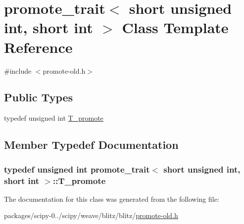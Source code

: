 \hypertarget{classpromote__trait_3_01short_01unsigned_01int_00_01short_01int_01_4}{}\section{promote\+\_\+trait$<$ short unsigned int, short int $>$ Class Template Reference}
\label{classpromote__trait_3_01short_01unsigned_01int_00_01short_01int_01_4}


{\ttfamily \#include $<$promote-\/old.\+h$>$}

\subsection*{Public Types}
\begin{DoxyCompactItemize}
\item 
typedef unsigned int \hyperlink{classpromote__trait_3_01short_01unsigned_01int_00_01short_01int_01_4_ad3579ce5a287118160697a2a5db0a756}{T\+\_\+promote}
\end{DoxyCompactItemize}


\subsection{Member Typedef Documentation}
\hypertarget{classpromote__trait_3_01short_01unsigned_01int_00_01short_01int_01_4_ad3579ce5a287118160697a2a5db0a756}{}
\subsubsection[{T\+\_\+promote}]{\setlength{\rightskip}{0pt plus 5cm}typedef unsigned int {\bf promote\+\_\+trait}$<$ short unsigned int, short int $>$\+::{\bf T\+\_\+promote}}\label{classpromote__trait_3_01short_01unsigned_01int_00_01short_01int_01_4_ad3579ce5a287118160697a2a5db0a756}


The documentation for this class was generated from the following file\+:\begin{DoxyCompactItemize}
\item 
packages/scipy-\/0../scipy/weave/blitz/blitz/\hyperlink{promote-old_8h}{promote-\/old.\+h}\end{DoxyCompactItemize}
